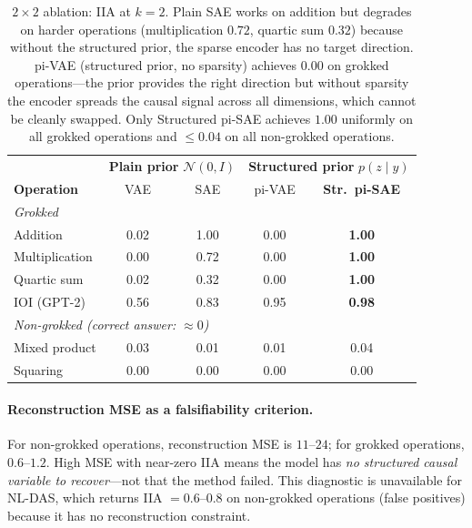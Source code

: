 \documentclass{article}
\begin{document}
\begin{table}[t]
\centering
\small
\setlength{\tabcolsep}{4pt}
\begin{tabular}{@{}l|cc|cc@{}}
\toprule
& \multicolumn{2}{c|}{\textbf{Plain prior} $\mathcal{N}(0,I)$}
& \multicolumn{2}{c}{\textbf{Structured prior} $p(z \mid y)$} \\
\textbf{Operation} & VAE & SAE & pi-VAE & \textbf{Str.\ pi-SAE} \\
\midrule
\multicolumn{5}{l}{\textit{Grokked}} \\
Addition       & 0.02 & 1.00 & 0.00 & \textbf{1.00} \\
Multiplication & 0.00 & 0.72 & 0.00 & \textbf{1.00} \\
Quartic sum    & 0.02 & 0.32 & 0.00 & \textbf{1.00} \\
IOI (GPT-2)    & 0.56 & 0.83 & 0.95 & \textbf{0.98} \\
\midrule
\multicolumn{5}{l}{\textit{Non-grokked (correct answer: $\approx 0$)}} \\
Mixed product  & 0.03 & 0.01 & 0.01 & 0.04 \\
Squaring       & 0.00 & 0.00 & 0.00 & 0.00 \\
\bottomrule
\end{tabular}
\caption{$2{\times}2$ ablation: IIA at $k{=}2$.
Plain SAE works on addition but degrades on harder operations (multiplication
$0.72$, quartic sum $0.32$) because without the structured prior, the sparse
encoder has no target direction.  pi-VAE (structured prior, no sparsity)
achieves $0.00$ on grokked operations---the prior provides the right
direction but without sparsity the encoder spreads the causal signal across
all dimensions, which cannot be cleanly swapped.  Only Structured pi-SAE
achieves $1.00$ uniformly on all grokked operations and $\leq 0.04$ on all
non-grokked operations.}
\label{tab:ablation}
\end{table}

\paragraph{Reconstruction MSE as a falsifiability criterion.}
For non-grokked operations, reconstruction MSE is $11$--$24$; for grokked
operations, $0.6$--$1.2$.  High MSE with near-zero IIA means the model has
\emph{no structured causal variable to recover}---not that the method
failed.  This diagnostic is unavailable for NL-DAS, which returns IIA $=
0.6$--$0.8$ on non-grokked operations (false positives) because it has no
reconstruction constraint.
\end{document}
